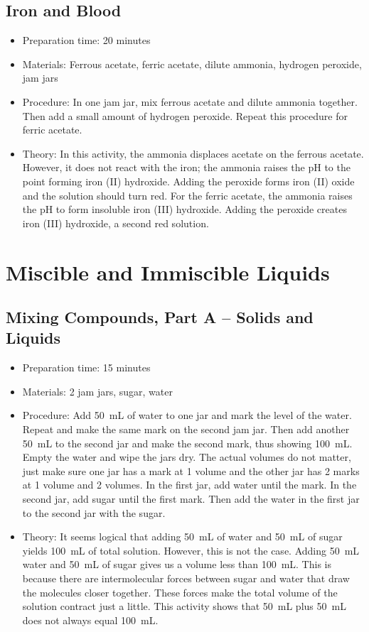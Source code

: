 \subsection{Iron and Blood}
\begin{itemize}
\item{Preparation time: 20 minutes}
\item{Materials: Ferrous acetate, ferric acetate, dilute ammonia, hydrogen peroxide, jam jars}
\item{Procedure: In one jam jar, mix ferrous acetate and dilute ammonia together. Then add a small amount of hydrogen peroxide. Repeat this procedure for ferric acetate.}
\item{Theory: In this activity, the ammonia displaces acetate on the ferrous acetate. However, it does not react with the iron; the ammonia raises the pH to the point forming iron (II) hydroxide. Adding the peroxide forms iron (II) oxide and the solution should turn red. For the ferric acetate, the ammonia raises the pH to form insoluble iron (III) hydroxide. Adding the peroxide creates iron (III) hydroxide, a second red solution.}
\end{itemize}

\section{Miscible and Immiscible Liquids}

\subsection{Mixing Compounds, Part A -- Solids and Liquids}
\begin{itemize}
\item{Preparation time: 15 minutes}
\item{Materials: 2 jam jars, sugar, water}
\item{Procedure: Add 50~mL of water to one jar and mark the level of the water. Repeat and make the same mark on the second jam jar. Then add another 50~mL to the second jar and make the second mark, thus showing 100~mL. Empty the water and wipe the jars dry. The actual volumes do not matter, just make sure one jar has a mark at 1 volume and the other jar has 2 marks at 1 volume and 2 volumes. In the first jar, add water until the mark. In the second jar, add sugar until the first mark. Then add the water in the first jar to the second jar with the sugar. }
\item{Theory: It seems logical that adding 50~mL of water and 50~mL of sugar yields 100~mL of total solution. However, this is not the case. Adding 50~mL water and 50~mL of sugar gives us a volume less than 100~mL. This is because there are intermolecular forces between sugar and water that draw the molecules closer together. These forces make the total volume of the solution contract just a little. This activity shows that 50~mL plus 50~mL does not always equal 100~mL.}
\end{itemize}

